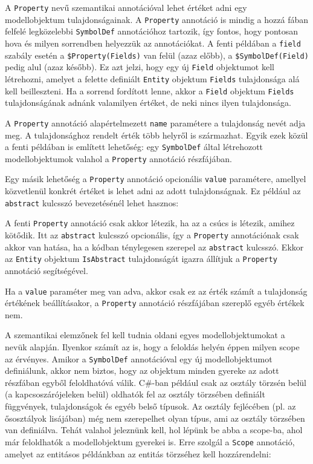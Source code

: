 \documentclass[12pt, a4paper]{report}
\newcommand{\f}[1]{\texttt{#1}}
\begin{document}
A \f{Property} nevű szemantikai annotációval lehet értéket adni egy modellobjektum tulajdonságainak. A \f{Property} annotáció is mindig a hozzá fában felfelé legközelebbi \f{SymbolDef} annotációhoz tartozik, így fontos, hogy pontosan hova és milyen sorrendben helyezzük az annotációkat. A fenti példában a \f{field} szabály esetén a \f{\$Property(Fields)} van felül (azaz előbb), a \f{\$SymbolDef(Field)} pedig alul (azaz később). Ez azt jelzi, hogy egy új \f{Field} objektumot kell létrehozni, amelyet a felette definiált \f{Entity} objektum \f{Fields} tulajdonsága alá kell beilleszteni. Ha a sorrend fordított lenne, akkor a \f{Field} objektum \f{Fields} tulajdonságának adnánk valamilyen értéket, de neki nincs ilyen tulajdonsága.

A \f{Property} annotáció alapértelmezett \f{name} paramétere a tulajdonság nevét adja meg. A tulajdonsághoz rendelt érték több helyről is származhat. Egyik ezek közül a fenti példában is említett lehetőség: egy \f{SymbolDef} által létrehozott modellobjektumok valahol a \f{Property} annotáció részfájában.

Egy másik lehetőség a \f{Property} annotáció opcionális \f{value} paramétere, amellyel közvetlenül konkrét értéket is lehet adni az adott tulajdonságnak. Ez például az \f{abstract} kulcsszó bevezetésénél lehet hasznos:


A fenti \f{Property} annotáció csak akkor létezik, ha az a csúcs is létezik, amihez kötődik. Itt az \f{abstract} kulcsszó opcionális, így a \f{Property} annotációnak csak akkor van hatása, ha a kódban ténylegesen szerepel az \f{abstract} kulcsszó. Ekkor az \f{Entity} objektum \f{IsAbstract} tulajdonságát igazra állítjuk a \f{Property} annotáció segítségével.

Ha a \f{value} paraméter meg van adva, akkor csak ez az érték számít a tulajdonság értékének beállításakor, a \f{Property} annotáció részfájában szereplő egyéb értékek nem.

A szemantikai elemzőnek fel kell tudnia oldani egyes modellobjektumokat a nevük alapján. Ilyenkor számít az is, hogy a feloldás helyén éppen milyen scope az érvényes. Amikor a \f{SymbolDef} annotációval egy új modellobjektumot definiálunk, akkor nem biztos, hogy az objektum minden gyereke az adott részfában egyből feloldhatóvá válik. C\#-ban például csak az osztály törzsén belül (a kapcsoszárójeleken belül) oldhatók fel az osztály törzsében definiált függvények, tulajdonságok és egyéb belső típusok. Az osztály fejlécében (pl. az ősosztályok lisájában) még nem szerepelhet olyan típus, ami az osztály törzsében van definiálva. Tehát valahol jeleznünk kell, hol lépünk be abba a scope-ba, ahol már feloldhatók a modellobjektum gyerekei is. Erre szolgál a \f{Scope} annotáció, amelyet az entitásos példánkban az entitás törzséhez kell hozzárendelni:
\end{document}
